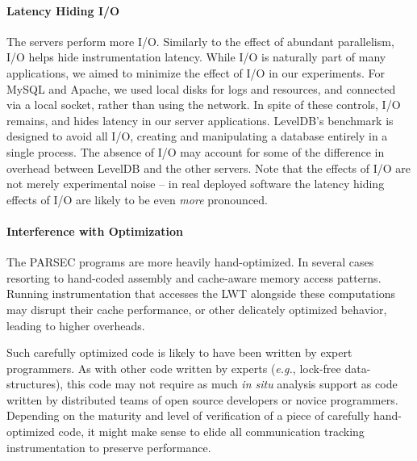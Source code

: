 \documentclass[preprint,9pt]{sigplanconf}
\newcommand{\lwt}{LWT\xspace}
\begin{document}
\paragraph{Latency Hiding I/O}
The servers perform more I/O.  Similarly to the effect of abundant parallelism,
I/O helps hide instrumentation latency.  While I/O is naturally part of many
applications, we aimed to minimize the effect of I/O in our experiments.  For
MySQL and Apache, we used local disks for logs and resources, and connected via
a local socket, rather than using the network.  In spite of these controls, I/O
remains, and hides latency in our server applications.  LevelDB's benchmark is
designed to avoid all I/O, creating and manipulating a database entirely in a
single process.  The absence of I/O may account for some of the difference in
overhead between LevelDB and the other servers.  Note that the effects of I/O
are not merely experimental noise -- in real deployed software the latency
hiding effects of I/O are likely to be even {\em more} pronounced.


\paragraph{Interference with Optimization}
The PARSEC programs are more heavily hand-optimized. In several cases
resorting to hand-coded assembly and cache-aware memory access patterns.
Running instrumentation that accesses the \lwt alongside these computations may
disrupt their cache performance, or other delicately optimized behavior,
leading to higher overheads.  

Such carefully optimized code is likely to have been written by expert
programmers.  As with other code written by experts ({\em e.g.}, lock-free
data-structures), this code may not require as much {\em in situ} analysis
support as code written by distributed teams of open source developers or
novice programmers.  Depending on the maturity and level of verification of a
piece of carefully hand-optimized code, it might make sense to elide all
communication tracking instrumentation to preserve performance. 
 
\end{document}
